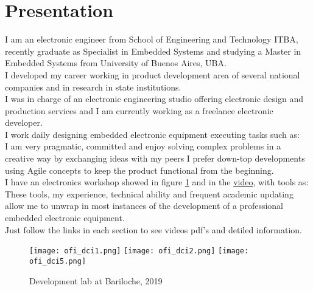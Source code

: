 \section{Presentation}
I am an electronic engineer from School of Engineering and Technology ITBA,
recently graduate as Specialist in Embedded Systems and studying a
Master in Embedded Systems from University of Buenos Aires, UBA.\\
I developed my career working in product development area of several
national companies and in research in state institutions.\\
I was in charge of an electronic engineering studio offering electronic design
and production services and I am currently working as a freelance electronic
developer. \\ %
I work daily designing embedded electronic equipment executing tasks such as: \\
I am very pragmatic, committed and enjoy solving complex problems in a creative way by exchanging ideas
with my peers I prefer down-top developments using Agile concepts to keep the product functional from
the beginning.\\
I have an electronics workshop showed in figure \ref{fig:ofi_dci} and in the \href{\linkofidci}{video}, with tools as:\\
These tools, my experience, technical ability and frequent academic updating allow me to unwrap
in most instances of the development of a professional embedded electronic equipment.\\
Just follow the links in each section to see videos pdf's and detiled information.\\
  \begin{figure}
      \begin{center}
         \texttt{[image: ofi\_dci1.png]}
         \texttt{[image: ofi\_dci2.png]}
         \texttt{[image: ofi\_dci5.png]}
      \end{center}
      \caption{Development lab at Bariloche, 2019}
      \label{fig:ofi_dci}
   \end{figure}
